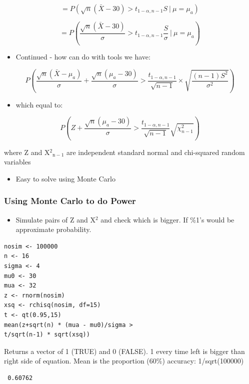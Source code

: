 \documentclass[11pt]{article}
\begin{document}
$$ = P\left(\sqrt{n}(\bar X - 30) > t_{1 - \alpha, n-1} S ~|~ \mu = \mu_a \right)    $$

$$ =P\left(\frac{\sqrt{n}(\bar X - 30)}{\sigma}   > t_{1-\alpha, n-1} \frac{S}{\sigma} ~|~ \mu = \mu_a \right) $$

\begin{itemize}
\item Continued - how can do with tools we have:
\end{itemize}

$$  P\left(\frac{\sqrt{n}(\bar X - \mu_a)}{\sigma} + \frac{\sqrt{n}(\mu_a - 30)}{\sigma} > \frac{t_{1-\alpha, n-1}}{\sqrt{n-1}}\times \sqrt{\frac{(n-1) S^2}{\sigma^2}} \right)$$

\begin{itemize}
\item which equal to:
\end{itemize}

$$P\left(Z + \frac{\sqrt{n}(\mu_a - 30)}{\sigma} >  \frac{t_{1 - \alpha, n-1}}{\sqrt{n-1}} \sqrt{\chi^2_{n-1}}\right) $$

where Z and X$^2$$_{\mathrm{n-1}}$ are independent standard normal and
chi-squared random variables

\begin{itemize}
\item Easy to solve using Monte Carlo
\end{itemize}
\subsubsection{Using Monte Carlo to do Power}
\label{sec-1-2-4}

\begin{itemize}
\item Simulate pairs of Z and X$^2$ and check which is bigger. If \%1's
  would be approximate probability.
\end{itemize}


\begin{verbatim}
nosim <- 100000
n <- 16
sigma <- 4
mu0 <- 30
mua <- 32
z <- rnorm(nosim)
xsq <- rchisq(nosim, df=15)
t <- qt(0.95,15)
mean(z+sqrt(n) * (mua - mu0)/sigma >
t/sqrt(n-1) * sqrt(xsq))
\end{verbatim}
Returns a vector of 1 (TRUE) and 0 (FALSE). 1 every time left is bigger than right
side of equation. Mean is the proportion (60\%) accuracy: 1/sqrt(100000)
\begin{verbatim}
 0.60762
\end{verbatim}
\end{document}
